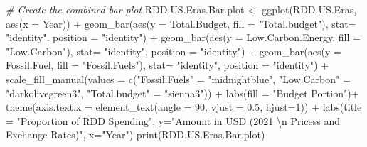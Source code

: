 \documentclass[
  12pt,
]{article}
\newenvironment{Shaded}{\begin{snugshade}}{\end{snugshade}}
\newcommand{\AttributeTok}[1]{\textcolor[rgb]{0.77,0.63,0.00}{#1}}
\newcommand{\CommentTok}[1]{\textcolor[rgb]{0.56,0.35,0.01}{\textit{#1}}}
\newcommand{\DecValTok}[1]{\textcolor[rgb]{0.00,0.00,0.81}{#1}}
\newcommand{\FloatTok}[1]{\textcolor[rgb]{0.00,0.00,0.81}{#1}}
\newcommand{\FunctionTok}[1]{\textcolor[rgb]{0.00,0.00,0.00}{#1}}
\newcommand{\NormalTok}[1]{#1}
\newcommand{\OtherTok}[1]{\textcolor[rgb]{0.56,0.35,0.01}{#1}}
\newcommand{\SpecialCharTok}[1]{\textcolor[rgb]{0.00,0.00,0.00}{#1}}
\newcommand{\StringTok}[1]{\textcolor[rgb]{0.31,0.60,0.02}{#1}}
\begin{document}
\begin{Shaded}
\begin{Highlighting}[]
\CommentTok{\# Create the combined bar plot}
\NormalTok{RDD.US.Eras.Bar.plot }\OtherTok{\textless{}{-}} \FunctionTok{ggplot}\NormalTok{(RDD.US.Eras, }\FunctionTok{aes}\NormalTok{(}\AttributeTok{x =}\NormalTok{ Year)) }\SpecialCharTok{+}
  \FunctionTok{geom\_bar}\NormalTok{(}\FunctionTok{aes}\NormalTok{(}\AttributeTok{y =}\NormalTok{ Total.Budget, }\AttributeTok{fill =} \StringTok{"Total.budget"}\NormalTok{), }\AttributeTok{stat=} \StringTok{"identity"}\NormalTok{, }\AttributeTok{position =} \StringTok{"identity"}\NormalTok{) }\SpecialCharTok{+}
  \FunctionTok{geom\_bar}\NormalTok{(}\FunctionTok{aes}\NormalTok{(}\AttributeTok{y =}\NormalTok{ Low.Carbon.Energy, }\AttributeTok{fill =} \StringTok{"Low.Carbon"}\NormalTok{), }\AttributeTok{stat=} \StringTok{"identity"}\NormalTok{, }\AttributeTok{position =} \StringTok{"identity"}\NormalTok{) }\SpecialCharTok{+}
  \FunctionTok{geom\_bar}\NormalTok{(}\FunctionTok{aes}\NormalTok{(}\AttributeTok{y =}\NormalTok{ Fossil.Fuel, }\AttributeTok{fill =} \StringTok{"Fossil.Fuels"}\NormalTok{), }\AttributeTok{stat=} \StringTok{"identity"}\NormalTok{, }\AttributeTok{position =} \StringTok{"identity"}\NormalTok{) }\SpecialCharTok{+}
  \FunctionTok{scale\_fill\_manual}\NormalTok{(}\AttributeTok{values =} \FunctionTok{c}\NormalTok{(}\StringTok{"Fossil.Fuels"} \OtherTok{=} \StringTok{"midnightblue"}\NormalTok{, }\StringTok{"Low.Carbon"} \OtherTok{=} \StringTok{"darkolivegreen3"}\NormalTok{, }\StringTok{"Total.budget"} \OtherTok{=} \StringTok{"sienna3"}\NormalTok{)) }\SpecialCharTok{+}
  \FunctionTok{labs}\NormalTok{(}\AttributeTok{fill =} \StringTok{"Budget Portion"}\NormalTok{)}\SpecialCharTok{+}
  \FunctionTok{theme}\NormalTok{(}\AttributeTok{axis.text.x =} \FunctionTok{element\_text}\NormalTok{(}\AttributeTok{angle =} \DecValTok{90}\NormalTok{, }\AttributeTok{vjust =} \FloatTok{0.5}\NormalTok{, }\AttributeTok{hjust=}\DecValTok{1}\NormalTok{)) }\SpecialCharTok{+}
  \FunctionTok{labs}\NormalTok{(}\AttributeTok{title =} \StringTok{"Proportion of RDD Spending"}\NormalTok{,}
       \AttributeTok{y=}\StringTok{"Amount in USD (2021 }\SpecialCharTok{\textbackslash{}n}\StringTok{ Pricess and Exchange Rates)"}\NormalTok{,}
       \AttributeTok{x=}\StringTok{"Year"}\NormalTok{)}
\FunctionTok{print}\NormalTok{(RDD.US.Eras.Bar.plot)}
\end{Highlighting}
\end{Shaded}
\end{document}
